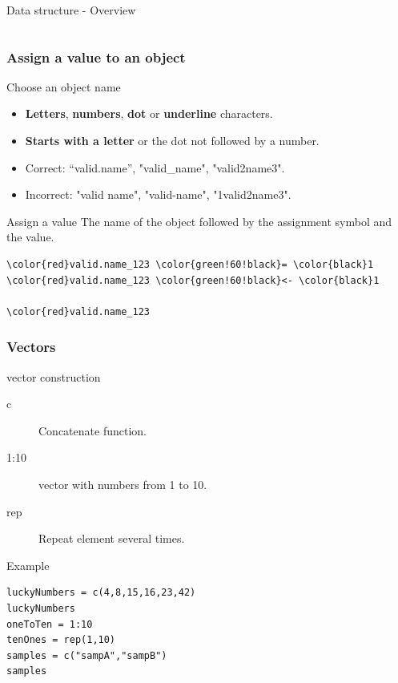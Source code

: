 \documentclass[10pt]{beamer}
\newenvironment{xframe}[2][]
  {\begin{frame}[fragile,environment=xframe,#1]
  \frametitle{#2}}
  {\end{frame}}
\begin{document}
\begin{frame}{Data structure - Overview}
\begin{columns}
\begin{column}{.2\textwidth}
    \end{column}
  \end{columns}
\end{frame}


\begin{xframe}{Assign a value to an object}
  \begin{block}{Choose an object name}
    \begin{itemize}
    \item {\bf Letters}, {\bf numbers}, {\bf dot} or {\bf underline} characters.
    \item {\bf Starts with a letter} or the dot not followed by a number.
    \item Correct: ``{\sf valid.name}'', "{\sf valid\_name}", "{\sf valid2name3}".
    \item Incorrect: "{\sf valid name}", "{\sf valid-name}", "{\sf 1valid2name3}".
    \end{itemize}
  \end{block}
  \begin{block}{Assign a value}
    The name of the object followed by the assignment symbol and the value.
    \medskip
\begin{Verbatim}[commandchars=\\\{\}]
\color{red}valid.name_123 \color{green!60!black}= \color{black}1
\color{red}valid.name_123 \color{green!60!black}<- \color{black}1

\color{red}valid.name_123
\end{Verbatim}
  \end{block}
\end{xframe}

\begin{xframe}{Vectors}
  \begin{block}{{\sf vector} construction}
    \begin{description}
    \item[c] Concatenate function.
    \item[1:10] {\sf vector} with numbers from 1 to 10.
    \item[rep] Repeat element several times.
    \end{description}
  \end{block}
  \begin{exampleblock}{Example}
\begin{verbatim}
luckyNumbers = c(4,8,15,16,23,42) 
luckyNumbers
oneToTen = 1:10
tenOnes = rep(1,10)
samples = c("sampA","sampB")
samples
\end{verbatim}
  \end{exampleblock}
\end{xframe}
\end{document}
